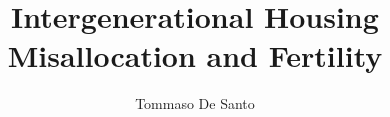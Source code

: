 \documentclass[11pt]{article}
\title{Intergenerational Housing Misallocation and Fertility}
\author{Tommaso De Santo}
\date{}
\theoremstyle{definition}
\newcommand{\1}{\mathbf 1}
\begin{document}
\maketitle

\pagebreak







\clearpage


\end{document}
